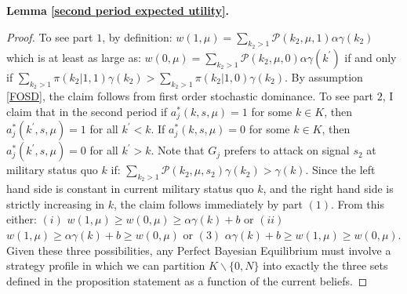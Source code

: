 \documentclass[11pt,]{article}
\begin{document}
\noindent\textbf{Lemma \ref{second period expected utility}.}
\begin{proof}  To see part $1$, by definition: $w(1,\mu)=\sum_{k_2>1}\mathcal{P}(k_2,\mu,1)\alpha\gamma(k_2)$ which is at least as large as: $w(0,\mu)=\sum_{k_2>1}\mathcal{P}(k_2,\mu,0)\alpha\gamma(k^{\prime})$ if and only if $\sum_{k_2>1}\pi(k_2|1,1)\gamma(k_2)>\sum_{k_2>1}\pi(k_2|1,0)\gamma(k_2)$.
By assumption \ref{FOSD}, the claim follows from first order stochastic dominance.  To see part $2$, I claim that in the second period if $a^*_j(k,s,\mu)=1$ for some $k\in K$, then $a^*_j(k^{\prime},s,\mu)=1$ for all $k^{\prime}<k$.  If $a^*_j(k,s,\mu)=0$ for some $k\in K$, then $a^*_j(k^{\prime},s,\mu)=0$ for all $k^{\prime}>k$.  Note that $G_j$ prefers to attack on signal $s_2$ at military status quo $k$ if: $\sum_{k_2>1}\mathcal{P}(k_2,\mu,s_2)\gamma(k_2)> \gamma(k)$.  Since the left hand side is constant in current military status quo $k$, and the right hand side is strictly increasing in $k$, the claim follows immediately by part $(1)$.  From this either: $(i)$ $w(1,\mu)\geq w(0,\mu)\geq \alpha\gamma(k)+b$ or $(ii)$ $w(1,\mu)\geq \alpha\gamma(k)+b\geq w(0,\mu)$ or $(3)$ $\alpha\gamma(k)+b\geq w(1,\mu)\geq w(0,\mu)$.  Given these three possibilities, any Perfect Bayesian Equilibrium must involve a strategy profile in which we can partition $K\backslash\{0,N\}$ into exactly the three sets defined in the proposition statement as a function of the current beliefs.  %
\end{proof}
\end{document}
